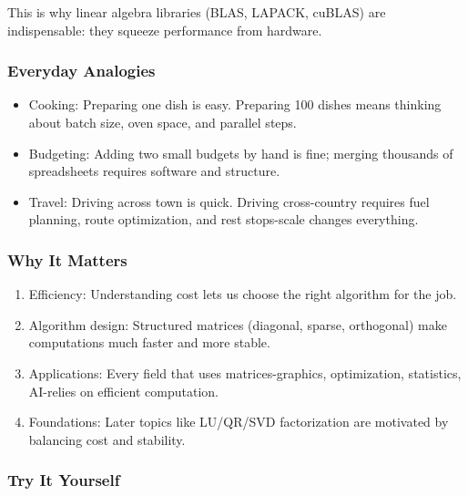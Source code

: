 \documentclass[
  letterpaper,
  DIV=11,
  numbers=noendperiod]{scrreprt}
\providecommand{\tightlist}{%
  \setlength{\itemsep}{0pt}\setlength{\parskip}{0pt}}
\begin{document}
This is why linear algebra libraries (BLAS, LAPACK, cuBLAS) are
indispensable: they squeeze performance from hardware.

\subsubsection{Everyday Analogies}\label{everyday-analogies-16}

\begin{itemize}
\tightlist
\item
  Cooking: Preparing one dish is easy. Preparing 100 dishes means
  thinking about batch size, oven space, and parallel steps.
\item
  Budgeting: Adding two small budgets by hand is fine; merging thousands
  of spreadsheets requires software and structure.
\item
  Travel: Driving across town is quick. Driving cross-country requires
  fuel planning, route optimization, and rest stops-scale changes
  everything.
\end{itemize}

\subsubsection{Why It Matters}\label{why-it-matters-16}

\begin{enumerate}
\def\labelenumi{\arabic{enumi}.}
\tightlist
\item
  Efficiency: Understanding cost lets us choose the right algorithm for
  the job.
\item
  Algorithm design: Structured matrices (diagonal, sparse, orthogonal)
  make computations much faster and more stable.
\item
  Applications: Every field that uses matrices-graphics, optimization,
  statistics, AI-relies on efficient computation.
\item
  Foundations: Later topics like LU/QR/SVD factorization are motivated
  by balancing cost and stability.
\end{enumerate}

\subsubsection{Try It Yourself}\label{try-it-yourself-19}
\end{document}
